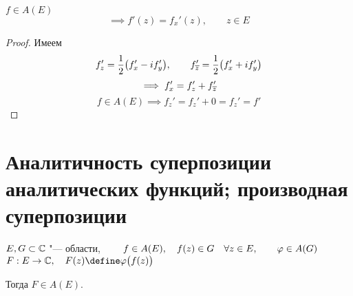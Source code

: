 \begin{implication}
	$ f \in A(E) $
	$$ \implies f'(z) = f_x'(z), \qquad z \in E $$
\end{implication}

\begin{proof}
	Имеем
	$$ f_z' = \frac12 \big( f_x' - if_y' \big), \qquad f_{\overline z}' = \frac12 \big( f_x' + if_y' \big) $$
	$$ \implies f_x' = f_z' + f_{\overline z}' $$
	$$ f \in A(E) \implies f_z' = f_z' + 0 = f_z' = f' $$
\end{proof}

\section{Аналитичность суперпозиции аналитических функций; производная суперпозиции}

\begin{theorem}
	$ E, G \subset \mathbb{C} $ "--- области, $ \qquad f \in A(E), \quad f(z) \in G \quad \forall z \in E, \qquad \varphi \in A(G) $ \\
	$ F : E \to \Co, \quad F(z) \define \vphi \big( f(z) \big) $

	Тогда $ F \in A(E) $.
\end{theorem}

